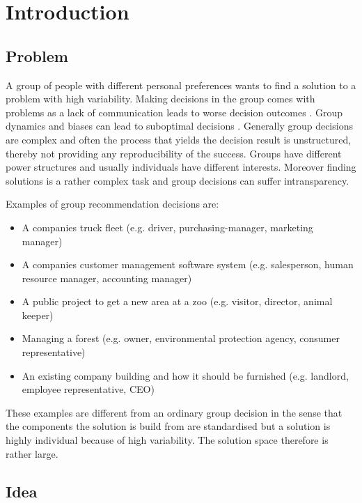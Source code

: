 \chapter{Introduction}
\label{ch:Introduction}

\section{Problem}
\label{sec:Introduction:Problem}

A group of people with different personal preferences wants to find a solution to a problem with high variability. Making decisions in the group comes with problems as a lack of communication leads to worse decision outcomes \cite{atasItemRecommendationUsing2017}. Group dynamics and biases can lead to suboptimal decisions \cite{kerrBiasJudgmentComparing1996}. Generally group decisions are complex and often the process that yields the decision result is unstructured, thereby not providing any reproducibility of the success. Groups have different power structures and usually individuals have different interests. Moreover finding solutions is a rather complex task and group decisions can suffer intransparency.

Examples of group recommendation decisions are:
\begin{itemize}
    \item A companies truck fleet (e.g. driver, purchasing-manager, marketing manager)
    \item A companies customer management software system (e.g. salesperson, human resource manager, accounting manager)
    \item A public project to get a new area at a zoo (e.g. visitor, director, animal keeper)
    \item Managing a forest (e.g. owner, environmental protection agency, consumer representative)
    \item An existing company building and how it should be furnished (e.g. landlord, employee representative, CEO)
\end{itemize}

These examples are different from an ordinary group decision in the sense that the components the solution is build from are standardised but a solution is highly individual because of high variability. The solution space therefore is rather large.

\section{Idea}
\label{sec:Introduction:Idea}

